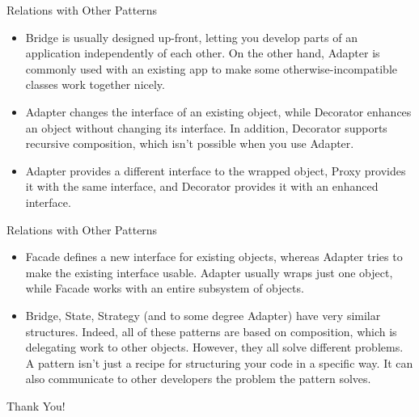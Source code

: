\documentclass[13pt]{beamer}
\begin{document}
\begin{frame}{Relations with Other Patterns}
	\begin{itemize}
		\setlength\itemsep{1em}
		\item Bridge is usually designed up-front, letting you develop parts of an application independently of each other. On the other hand, Adapter is commonly used with an existing app to make some otherwise-incompatible classes work together nicely.
		\item Adapter changes the interface of an existing object, while Decorator enhances an object without changing its interface. In addition, Decorator supports recursive composition, which isn’t possible when you use Adapter.
		\item Adapter provides a different interface to the wrapped object, Proxy provides it with the same interface, and Decorator provides it with an enhanced interface.
	\end{itemize}
\end{frame}

\begin{frame}{Relations with Other Patterns}
	\begin{itemize}
		\setlength\itemsep{1em}
		\item Facade defines a new interface for existing objects, whereas Adapter tries to make the existing interface usable. Adapter usually wraps just one object, while Facade works with an entire subsystem of objects.
		\item Bridge, State, Strategy (and to some degree Adapter) have very similar structures. Indeed, all of these patterns are based on composition, which is delegating work to other objects. However, they all solve different problems. A pattern isn’t just a recipe for structuring your code in a specific way. It can also communicate to other developers the problem the pattern solves.
	\end{itemize}
\end{frame}

\begin{frame}
\begin{center}
{\fontsize{40}{50}\selectfont Thank You!}
\end{center}
\end{frame}
\end{document}
